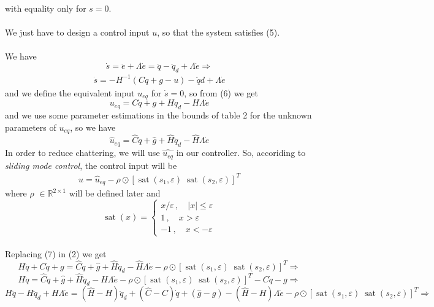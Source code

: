\documentclass[a4paper]{article}
\newcommand\R{\mathbb{R}}
\begin{document}
    with equality only for $s=0$. \\\\
    We just have to design a control input $u$, so that the system satisfies (5). \\\\
    We have 
    $$  
        \dot{s}=\ddot{e}+\Lambda \dot{e}=\ddot{q}-\ddot{q}_{d}+\Lambda \dot{e} \Rightarrow 
    $$
    \begin{align}
        \dot{s} = -H^{-1}(C \dot{q}+g-u)-\ddot{q} d+\Lambda \dot{e}
    \end{align}
    and we define the equivalent input $u_{eq}$ for $\dot{s} = 0$, so from (6) we get
    $$
        u_{e q}=C \dot{q}+g+H \ddot{q}_{d}-H \Lambda \dot{e}
    $$
    and we use some parameter estimations in the bounds of table 2 for the unknown parameters 
    of $u_{eq}$, so we have 
    $$
        \hat{u}_{e q}=\hat{C} \dot{q}+\hat{g}+\hat{H} \ddot{q}_{d}-\hat{H} \Lambda \dot{e}
    $$
    In order to reduce chattering, we will use $\hat{u_{eq}}$ in our controller.
    So, accoriding to \textit{sliding mode control}, the control input will be 
    \begin{align}
        u=\hat{u}_{e q}- \rho \odot [\operatorname{sat}(s_1, \varepsilon) \; \operatorname{sat}(s_2, \varepsilon)]^T
    \end{align}
    where $\rho$ $\in \R^{2\times1}$ will be defined later and
    $$
        \operatorname{sat}(x)=\left\{\begin{array}{c}
        x / \varepsilon \, ,\quad \left| x \right| \leq \varepsilon \\
        1 \, , \quad x > \varepsilon \\
        -1 \, , \quad x < -\varepsilon
        \end{array}\right.
    $$
    \\
    Replacing (7) in (2) we get
    $$
        H \ddot{q} + C \dot{q} + g = 
        \hat{C} \dot{q} + \hat{g} + \hat{H} \ddot{q}_{d} - \hat{H} \Lambda \dot{e} - \rho \odot [\operatorname{sat}(s_1, \varepsilon) \; \operatorname{sat}(s_2, \varepsilon)]^T \Rightarrow
    $$
    $$
        H \ddot{q}=\hat{C} \dot{q} + \hat{g} + \hat{H} \ddot{q}_{d} -\hat{H} \Lambda \dot{e} - 
        \rho \odot [\operatorname{sat}(s_1, \varepsilon) \; \operatorname{sat}(s_2, \varepsilon)]^T - C \dot{q} - g \Rightarrow
    $$
    $$
        H \ddot{q} - H \ddot{q}_{d} + H \Lambda \dot{e} = 
        (\hat{H}-H) \ddot{q}_{d} + (\hat{C}-C) \dot{q} + (\hat{g}-g)- (\hat{H}-H) \Lambda \dot{e}- \rho \odot [\operatorname{sat}(s_1, \varepsilon) \; \operatorname{sat}(s_2, \varepsilon)]^T \Rightarrow
    $$
\end{document}
